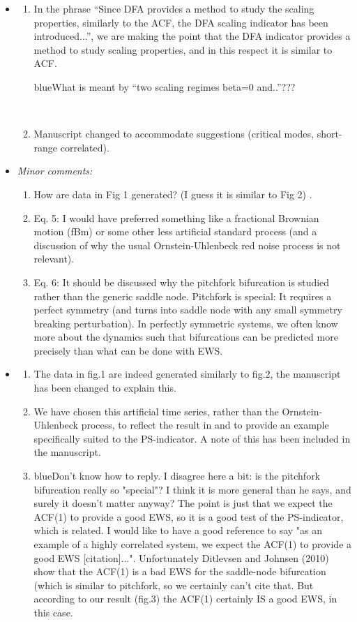 \documentclass[12pt]{article}
\def\bb{\begin{color}{blue}}
\def\eb{\end{color}\ }
\begin{document}
\begin{itemize}
\item[\bf Response 4.]
\begin{enumerate}
\item In the phrase ``Since DFA provides a method to study the scaling properties, similarly to the ACF, the DFA scaling indicator has been introduced...'', we are making the point that the DFA indicator provides a method to study scaling properties, and in this respect it is similar to ACF. {\bb What is meant by ``two scaling regimes beta=0 and..''???\eb}
\item Manuscript changed to accommodate suggestions (critical modes, short-range correlated).
\end{enumerate}

\item[\bf Comment 5.]
{\sl 
Minor comments:
\begin{enumerate}
\item How are data in Fig 1 generated? (I guess it is similar to Fig 2) .
\item Eq. 5: I would have preferred something like a fractional Brownian motion (fBm) or some other less artificial standard process (and a discussion of why the usual Ornstein-Uhlenbeck red noise process is not relevant).
\item Eq. 6: It should be discussed why the pitchfork bifurcation is studied rather than the generic saddle node. Pitchfork is special: It requires a perfect symmetry (and turns into saddle node with any small symmetry breaking perturbation). In perfectly symmetric systems, we often know more about the dynamics such that bifurcations can be predicted more precisely than what can be done with EWS.
\end{enumerate}
}

\item[\bf Response 5.]
\begin{enumerate}
\item The data in fig.1 are indeed generated similarly to fig.2, the manuscript has been changed to explain this.
\item We have chosen this artificial time series, rather than the Ornstein-Uhlenbeck process, to reflect the result in \cite{livina2012} and to provide an example specifically suited to the PS-indicator. A note of this has been included in the manuscript.
\item {\bb Don't know how to reply. I disagree here a bit: is the pitchfork bifurcation really so "special"? I think it is more general than he says, and surely it doesn't matter anyway? The point is just that we expect the ACF(1) to provide a good EWS, so it is a good test of the PS-indicator, which is related. I would like to have a good reference to say "as an example of a highly correlated system, we expect the ACF(1) to provide a good EWS [citation]...". Unfortunately Ditlevsen and Johnsen (2010) show that the ACF(1) is a bad EWS for the saddle-node bifurcation (which is similar to pitchfork, so we certainly can't cite that. But according to our result (fig.3) the ACF(1) certainly IS a good EWS, in this case. \eb}
\end{enumerate}


\end{itemize}
\end{document}
